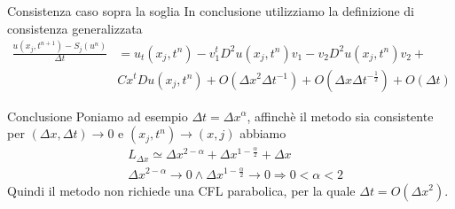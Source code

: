 \begin{frame}{Consistenza caso sopra la soglia}
In conclusione utilizziamo la definizione di consistenza generalizzata
\[
\begin{aligned}
\frac{u(x_j,t^{n+1})-S_j(u^n)}{\Delta
  t}&=u_t(x_j,t^n)-v_1^tD^2u(x_j,t^n)v_1-v_2D^2u(x_j,t^n)v_2+\\
& Cx^tDu(x_j,t^n)+O(\Delta x^2\Delta t^{-1})+O(\Delta x\Delta
t^{-\frac{1}{2}})+O(\Delta t)
\end{aligned}
\]
\begin{alertblock}{Conclusione}
Poniamo ad esempio $\Delta t=\Delta x^{\alpha}$, affinchè il metodo
sia consistente per $(\Delta x,\Delta t)\to 0$ e $(x_j,t^n)\to (x,j)$
abbiamo 
\[
\begin{aligned}
&L_{\Delta x}\simeq\Delta x^{2-\alpha}+\Delta
x^{1-\frac{\alpha}{2}}+\Delta x \\
&\Delta x^{2-\alpha}\to 0\land\Delta x^{1-\frac{\alpha}{2}}\to 0\Rightarrow0<\alpha<2
\end{aligned}
\]
Quindi il metodo non richiede una CFL parabolica, per la quale
$\Delta t=O(\Delta x^2)$.
\end{alertblock}
\end{frame}

